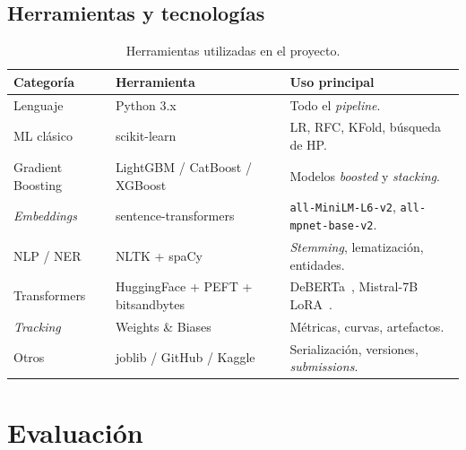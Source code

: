 \documentclass[12pt,a4paper]{article}
\begin{document}
\subsection*{Herramientas y tecnologías}

\begin{table}[H]
  \centering
  \caption{Herramientas utilizadas en el proyecto.}
  \label{tab:tools}
  {\small
  \renewcommand{\arraystretch}{1.1}
  \begin{tabular}{@{}lll@{}}
    \toprule
    \textbf{Categoría}       & \textbf{Herramienta}                                                  & \textbf{Uso principal} \\
    \midrule
    Lenguaje                 & Python 3.x~\cite{python}                                              & Todo el \emph{pipeline}. \\
    ML clásico               & scikit-learn~\cite{sklearn}                                           & LR, RFC, KFold, búsqueda de HP. \\
    Gradient Boosting        & LightGBM / CatBoost / XGBoost~\cite{lgbm,catboost,xgboost}           & Modelos \emph{boosted} y \emph{stacking}. \\
    \emph{Embeddings}        & sentence-transformers~\cite{sbert}                                    & \texttt{all-MiniLM-L6-v2}, \texttt{all-mpnet-base-v2}. \\
    NLP / NER                & NLTK + spaCy~\cite{nltk,spacy}                                        & \emph{Stemming}, lematización, entidades. \\
    Transformers             & HuggingFace + PEFT + bitsandbytes~\cite{hf_transformers,peft,bitsandbytes} & DeBERTa~\cite{deberta}, Mistral-7B LoRA~\cite{mistral}. \\
    \emph{Tracking}          & Weights \& Biases~\cite{wandb}                                        & Métricas, curvas, artefactos. \\
    Otros                    & joblib / GitHub / Kaggle~\cite{joblib,github,kaggle}                  & Serialización, versiones, \emph{submissions}. \\
    \bottomrule
  \end{tabular}}
\end{table}

\section{Evaluación}
\end{document}

